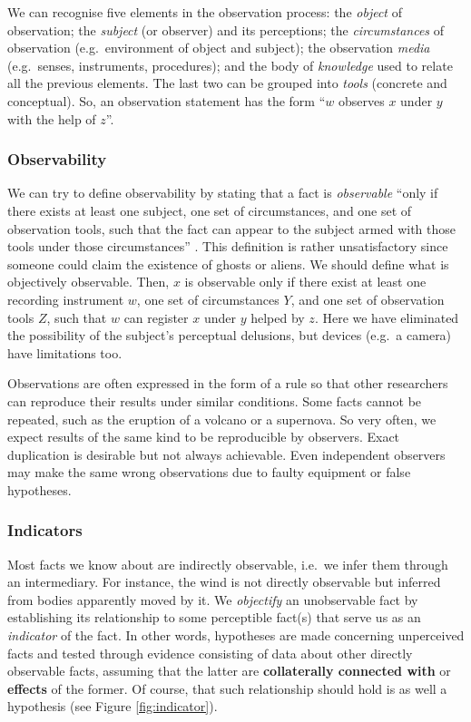 \documentclass[
]{book}
\begin{document}
We can recognise five elements in the observation process: the \emph{object} of observation; the \emph{subject} (or observer) and its perceptions; the \emph{circumstances} of observation (e.g.~environment of object and subject); the observation \emph{media} (e.g.~senses, instruments, procedures); and the body of \emph{knowledge} used to relate all the previous elements. The last two can be grouped into \emph{tools} (concrete and conceptual). So, an observation statement has the form ``\(w\) observes \(x\) under \(y\) with the help of \(z\)''. \citep{bunge2017philosophy}

\hypertarget{observability}{%
\subsubsection{Observability}\label{observability}}

We can try to define observability by stating that a fact is \emph{observable} ``only if there exists at least one subject, one set of circumstances, and one set of observation tools, such that the fact can appear to the subject armed with those tools under those circumstances'' \citep{bunge2017philosophy}. This definition is rather unsatisfactory since someone could claim the existence of ghosts or aliens. We should define what is objectively observable. Then, \(x\) is observable only if there exist at least one recording instrument \(w\), one set of circumstances \(Y\), and one set of observation tools \(Z\), such that \(w\) can register \(x\) under \(y\) helped by \(z\). Here we have eliminated the possibility of the subject's perceptual delusions, but devices (e.g.~a camera) have limitations too.

Observations are often expressed in the form of a rule so that other researchers can reproduce their results under similar conditions. Some facts cannot be repeated, such as the eruption of a volcano or a supernova. So very often, we expect results of the same kind to be reproducible by observers. Exact duplication is desirable but not always achievable. Even independent observers may make the same wrong observations due to faulty equipment or false hypotheses.

\hypertarget{indicators}{%
\subsubsection{Indicators}\label{indicators}}

Most facts we know about are indirectly observable, i.e.~we infer them through an intermediary. For instance, the wind is not directly observable but inferred from bodies apparently moved by it. We \emph{objectify} an unobservable fact by establishing its relationship to some perceptible fact(s) that serve us as an \emph{indicator} of the fact. In other words, hypotheses are made concerning unperceived facts and tested through evidence consisting of data about other directly observable facts, assuming that the latter are \textbf{collaterally connected with} or \textbf{effects} of the former. Of course, that such relationship should hold is as well a hypothesis (see Figure \ref{fig:indicator}).
\end{document}

